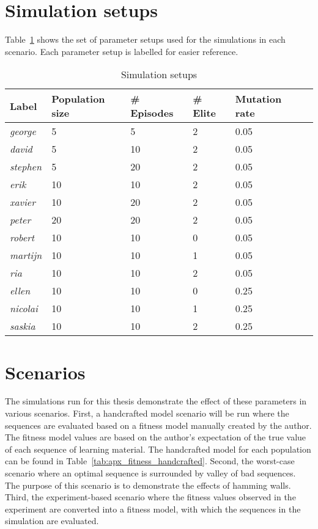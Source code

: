 \section{Simulation setups}
Table~\ref{tab:simulation_setups} shows the set of parameter setups used for
the simulations in each scenario. Each parameter setup is labelled for easier
reference.
\begin{table}
	\centering
	\begin{tabular}{llllll}\hline
		\textbf{Label} & \textbf{Population size} & \textbf{\# Episodes}
		& \textbf{\# Elite} & \textbf{Mutation rate} \\\hline
		\emph{george} & 5 & 5 & 2 & 0.05 \\
		\emph{david} & 5 & 10 & 2 & 0.05 \\
		\emph{stephen} & 5 & 20 & 2 & 0.05 \\
		\emph{erik} & 10 & 10 & 2 & 0.05 \\
		\emph{xavier} & 10 & 20 & 2 & 0.05 \\
		\emph{peter} & 20 & 20 & 2 & 0.05 \\\hdashline
		\emph{robert} & 10 & 10 & 0 & 0.05 \\
		\emph{martijn} & 10 & 10 & 1 & 0.05 \\
		\emph{ria} & 10 & 10 & 2 & 0.05 \\
		\emph{ellen} & 10 & 10 & 0 & 0.25 \\
		\emph{nicolai} & 10 & 10 & 1 & 0.25 \\
		\emph{saskia} & 10 & 10 & 2 & 0.25 \\
	\end{tabular}
	\caption{Simulation setups}
	\label{tab:simulation_setups}
\end{table}
\section{Scenarios}
The simulations run for this thesis demonstrate the effect of these parameters
in various scenarios. First, a handcrafted model scenario will be run where the
sequences are evaluated based on a fitness model manually created by the
author. The fitness model values are based on the author's expectation of the
true value of each sequence of learning material. The handcrafted model for
each population can be found in
Table~\ref{tab:apx_fitness_handcrafted}. Second, the worst-case scenario where
an optimal sequence is surrounded by valley of bad sequences. The purpose of
this scenario is to demonstrate the effects of hamming walls. Third, the
experiment-based scenario where the fitness values observed in the experiment
are converted into a fitness model, with which the sequences in the simulation
are evaluated.
